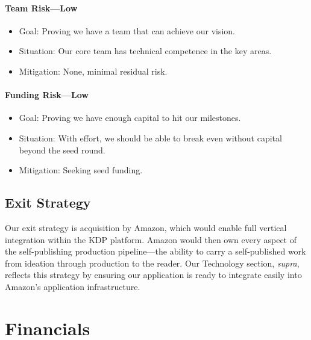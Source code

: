 \documentclass[11pt,openany]{book}
\providecommand{\tightlist}{%
  \setlength{\itemsep}{0pt}\setlength{\parskip}{0pt}}
\begin{document}
\hypertarget{team-risklow}{%
\subsubsection{Team Risk---Low}\label{team-risklow}}

\begin{itemize}
\tightlist
\item
  Goal: Proving we have a team that can achieve our vision.
\item
  Situation: Our core team has technical competence in the key areas.
\item
  Mitigation: None, minimal residual risk.
\end{itemize}

\newpage{}

\hypertarget{funding-risklow}{%
\subsubsection{Funding Risk---Low}\label{funding-risklow}}

\begin{itemize}
\tightlist
\item
  Goal: Proving we have enough capital to hit our milestones.
\item
  Situation: With effort, we should be able to break even without
  capital beyond the seed round.
\item
  Mitigation: Seeking seed funding.
\end{itemize}

\hypertarget{exit-strategy}{%
\section{Exit Strategy}\label{exit-strategy}}

Our exit strategy is acquisition by Amazon, which would enable full
vertical integration within the KDP platform. Amazon would then own
every aspect of the self-publishing production pipeline---the ability to
carry a self-published work from ideation through production to the
reader. Our Technology section, \emph{supra}, reflects this strategy by
ensuring our application is ready to integrate easily into Amazon's
application infrastructure.

\hypertarget{financials}{%
\chapter{Financials}\label{financials}}
\end{document}

